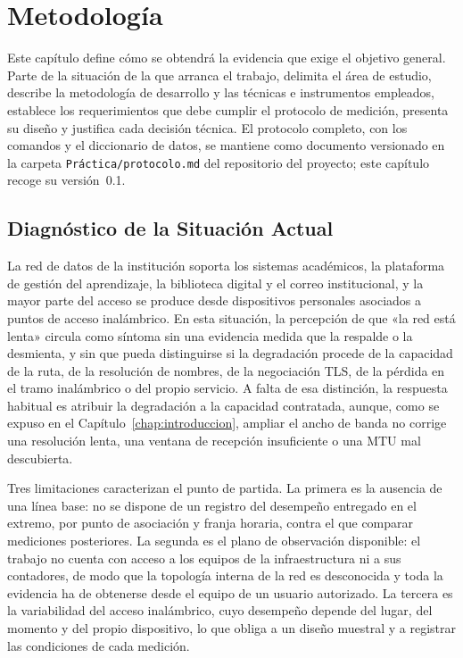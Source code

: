 \chapter{Metodología}
\label{chap:metodologia}

\providecommand{\pendiente}[1]{\textcolor{red!70!black}{\textbf{[Pendiente: #1]}}}

Este capítulo define cómo se obtendrá la evidencia que exige el objetivo general. Parte de la situación de la que arranca el trabajo, delimita el área de estudio, describe la metodología de desarrollo y las técnicas e instrumentos empleados, establece los requerimientos que debe cumplir el protocolo de medición, presenta su diseño y justifica cada decisión técnica. El protocolo completo, con los comandos y el diccionario de datos, se mantiene como documento versionado en la carpeta \texttt{Práctica/protocolo.md} del repositorio del proyecto; este capítulo recoge su versión~0.1.

\section{Diagnóstico de la Situación Actual}

La red de datos de la institución soporta los sistemas académicos, la plataforma de gestión del aprendizaje, la biblioteca digital y el correo institucional, y la mayor parte del acceso se produce desde dispositivos personales asociados a puntos de acceso inalámbrico. En esta situación, la percepción de que «la red está lenta» circula como síntoma sin una evidencia medida que la respalde o la desmienta, y sin que pueda distinguirse si la degradación procede de la capacidad de la ruta, de la resolución de nombres, de la negociación TLS, de la pérdida en el tramo inalámbrico o del propio servicio. A falta de esa distinción, la respuesta habitual es atribuir la degradación a la capacidad contratada, aunque, como se expuso en el Capítulo~\ref{chap:introduccion}, ampliar el ancho de banda no corrige una resolución lenta, una ventana de recepción insuficiente o una MTU mal descubierta.

Tres limitaciones caracterizan el punto de partida. La primera es la ausencia de una línea base: no se dispone de un registro del desempeño entregado en el extremo, por punto de asociación y franja horaria, contra el que comparar mediciones posteriores. La segunda es el plano de observación disponible: el trabajo no cuenta con acceso a los equipos de la infraestructura ni a sus contadores, de modo que la topología interna de la red es desconocida y toda la evidencia ha de obtenerse desde el equipo de un usuario autorizado. La tercera es la variabilidad del acceso inalámbrico, cuyo desempeño depende del lugar, del momento y del propio dispositivo, lo que obliga a un diseño muestral y a registrar las condiciones de cada medición.

